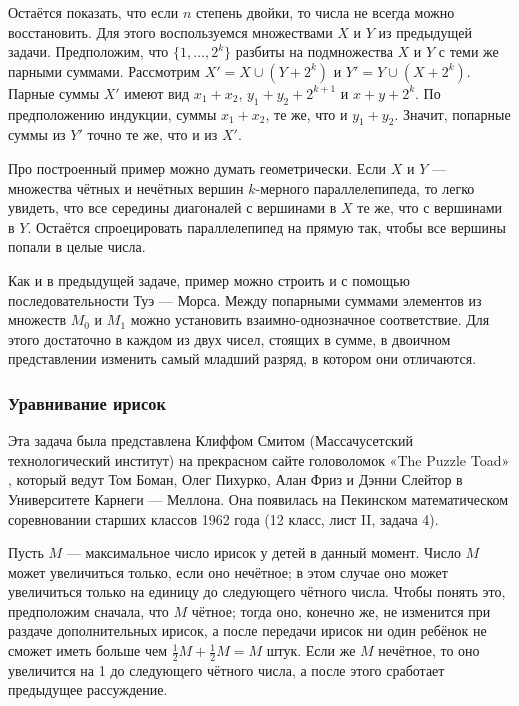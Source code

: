 Остаётся показать, что если $n$ степень двойки, то
числа не всегда можно восстановить.
Для этого воспользуемся множествами $X$ и $Y$ из предыдущей задачи.
Предположим, что $\{1, \dots , 2^k\}$ разбиты на подмножества $X$ и $Y$ с теми же парными суммами.
Рассмотрим $X' = X \cup (Y + 2^k)$ и $Y' = Y \cup (X + 2^k)$.
Парные суммы $X'$ имеют вид $x_1 + x_2$, $y_1 + y_2 + 2^{k+1}$ и $x + y + 2^k$.
По предположению индукции,
суммы $x_1 + x_2$, те же, что и $y_1 + y_2$.
Значит, попарные суммы из $Y'$ точно те же, что и из $X'$.

\begin{addedbytheeditors}
Про построенный пример можно думать геометрически.
Если $X$ и $Y$ --- множества чётных и нечётных вершин $k$-мерного параллелепипеда, то легко увидеть, что все середины диагоналей с вершинами в $X$ те же, что с вершинами в $Y$.
Остаётся спроецировать параллелепипед на прямую так, чтобы все вершины попали в целые числа.

Как и в предыдущей задаче, пример можно строить и с помощью последовательности Туэ --- Морса. Между попарными суммами элементов из множеств $M_0$ и $M_1$ можно установить взаимно-однозначное соответствие.
Для этого достаточно в каждом из двух чисел, стоящих в сумме, в двоичном представлении изменить самый младший разряд, в котором они отличаются. \pr
\end{addedbytheeditors}

\subsubsection*{Уравнивание ирисок}

Эта задача была представлена Клиффом Смитом (Массачусетский технологический институт) на прекрасном сайте головоломок «The Puzzle Toad» \cite{bohman-pikhurko-frieze-sleator}, который ведут Том Боман, Олег Пихурко, Алан Фриз и Дэнни Слейтор в Университете Карнеги --- Меллона.
Она появилась на Пекинском математическом соревновании старших классов 1962 года (12 класс, лист II, задача 4).

Пусть $M$ --- максимальное число ирисок у детей в данный момент.
Число $M$ может увеличиться только, если оно нечётное;
в этом случае оно может увеличиться только на единицу до следующего чётного числа.
Чтобы понять это, предположим сначала, что $M$ чётное; тогда оно, конечно же, не изменится при раздаче дополнительных ирисок, а после передачи ирисок ни один ребёнок не сможет иметь больше чем $\tfrac12 M + \tfrac12 M = M$ штук.
Если же $M$ нечётное, то оно увеличится на 1 до следующего чётного числа, а после этого сработает предыдущее рассуждение.

